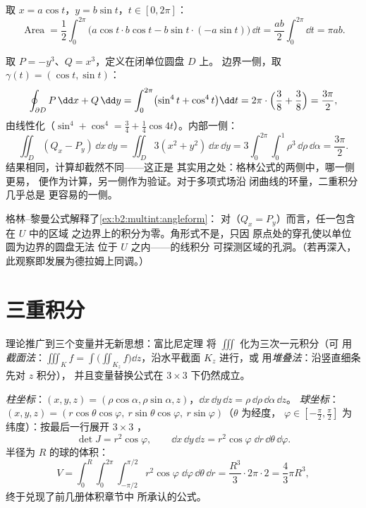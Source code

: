 \begin{example}[椭圆的面积]\label{ex:b2:multint:ellipsearea}
取 $x = a\cos t$，$y = b\sin t$，$t \in [0, 2\pi]$：
\[
\operatorname{Area}
= \frac12\int_0^{2\pi}\bigl(a\cos t \cdot b\cos t
- b\sin t\cdot(-a\sin t)\bigr)\,\dd t
= \frac{ab}{2}\int_0^{2\pi}\dd t = \pi ab .
\]
\end{example}

\begin{example}\label{ex:b2:multint:greencheck}
取 $P = -y^3$、$Q = x^3$，定义在闭单位圆盘 $D$ 上。
边界一侧，取 $\gamma(t) = (\cos t, \sin t)$：
\[
\oint_{\partial D}P\,\dd x + Q\,\dd y
= \int_0^{2\pi}\bigl(\sin^4 t + \cos^4 t\bigr)\dd t
= 2\pi\cdot\Bigl(\frac38 + \frac38\Bigr) = \frac{3\pi}2 ,
\]
由线性化（$\sin^4 + \cos^4 = \tfrac34 +
\tfrac14\cos4t$）。内部一侧：
\[
\iint_D(Q_x - P_y)\,\dd x\,\dd y
= \iint_D 3(x^2 + y^2)\,\dd x\,\dd y
= 3\int_0^{2\pi}\!\!\int_0^1\rho^3\,\dd\rho\,\dd\alpha
= \frac{3\pi}2 .
\]
结果相同，计算却截然不同——这正是
其实用之处：格林公式的两侧中，哪一侧更易，
便作为计算，另一侧作为验证。对于多项式场沿
闭曲线的环量，二重积分几乎总是
更容易的一侧。
\end{example}

\begin{remark}
格林–黎曼公式解释了\cref{ex:b2:multint:angleform}：
对（$Q_x = P_y$）而言，任一包含在 $U$ 中的区域
之边界上的积分为零。角形式不是，只因
原点处的穿孔使以单位圆为边界的圆盘无法
位于 $U$ 之内——的线积分
可探测区域的孔洞。（若再深入，
此观察即发展为德拉姆上同调。）
\end{remark}

\section{三重积分}

理论推广到三个变量并无新思想：富比尼定理
将 $\iiint$ 化为三次一元积分（可
用\emph{截面法}：$\iiint_K f = \int\bigl(\iint_{K_z}
f\bigr)\dd z$，沿水平截面 $K_z$ 进行，或
用\emph{堆叠法}：沿竖直细条先对 $z$ 积分），
并且变量替换公式在 $3 \times 3$
下仍然成立。

\begin{example}[柱坐标与球坐标]\label{ex:b2:multint:spherical}
\emph{柱坐标}：$(x, y, z) = (\rho\cos\alpha, \rho\sin\alpha,
z)$，$\dd x\,\dd y\,\dd z = \rho\,\dd\rho\,\dd\alpha\,\dd z$。
\emph{球坐标}：$(x, y, z) = (r\cos\theta\cos\varphi,\
r\sin\theta\cos\varphi,\ r\sin\varphi)$（$\theta$ 为经度，
$\varphi \in [-\frac\pi2, \frac\pi2]$ 为纬度）：按最后一行展开 $3
\times 3$ ，
\[
\det J = r^2\cos\varphi ,
\qquad
\dd x\,\dd y\,\dd z
= r^2\cos\varphi\;\dd r\,\dd\theta\,\dd\varphi .
\]
半径为 $R$ 的球的体积：
\[
V = \int_0^R\!\!\int_0^{2\pi}\!\!\int_{-\pi/2}^{\pi/2}
r^2\cos\varphi\;\dd\varphi\,\dd\theta\,\dd r
= \frac{R^3}{3}\cdot 2\pi \cdot 2
= \boxed{\frac43\pi R^3} ,
\]
终于兑现了前几册体积章节中
所承认的公式。
\end{example}

